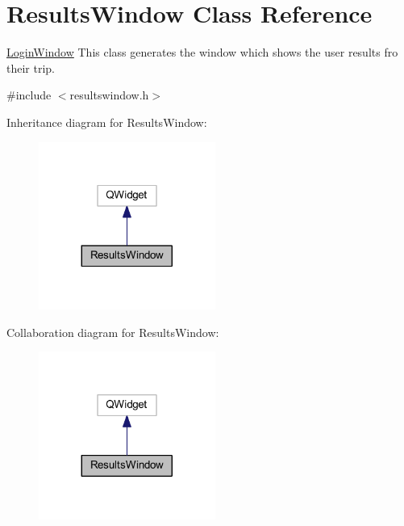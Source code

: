 \hypertarget{class_results_window}{}\section{Results\+Window Class Reference}
\label{class_results_window}


\mbox{\hyperlink{class_login_window}{Login\+Window}} This class generates the window which shows the user results fro their trip.  




{\ttfamily \#include $<$resultswindow.\+h$>$}



Inheritance diagram for Results\+Window\+:
\nopagebreak
\begin{figure}[H]
\begin{center}
\leavevmode
\includegraphics[width=164pt]{class_results_window__inherit__graph}
\end{center}
\end{figure}


Collaboration diagram for Results\+Window\+:
\nopagebreak
\begin{figure}[H]
\begin{center}
\leavevmode
\includegraphics[width=164pt]{class_results_window__coll__graph}
\end{center}
\end{figure}
